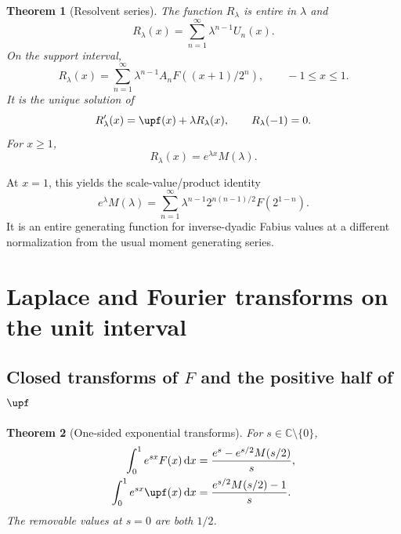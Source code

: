 \documentclass[11pt,oneside]{article}
\newtheorem{theorem}{Theorem}[section]
\theoremstyle{definition}
\theoremstyle{remark}
\newcommand{\C}{\mathbb C}
\newcommand{\dd}{\,\mathrm d}
\newcommand{\1}{\mathbf 1}
\begin{document}
\begin{theorem}[Resolvent series]
\label{p6:thm:resolvent}
The function \(R_\lambda\) is entire in \(\lambda\) and
\begin{equation}
 R_\lambda(x)=\sum_{n=1}^{\infty}\lambda^{n-1}U_n(x).     \label{p6:eq:resolvent-series}
\end{equation}
On the support interval,
\begin{equation}
 R_\lambda(x)=\sum_{n=1}^{\infty}\lambda^{n-1}
 A_nF((x+1)/2^n),\qquad -1\le x\le1.                     \label{p6:eq:resolvent-F-series}
\end{equation}
It is the unique solution of
\begin{equation}
 R_\lambda'(x)=\upf(x)+\lambda R_\lambda(x),\qquad R_\lambda(-1)=0. \label{p6:eq:resolvent-ode}
\end{equation}
For \(x\ge1\),
\begin{equation}
 R_\lambda(x)=e^{\lambda x}M(\lambda).                   \label{p6:eq:resolvent-tail}
\end{equation}
\end{theorem}

At \(x=1\), this yields the scale-value/product identity
\begin{equation}
 e^\lambda M(\lambda)
 =\sum_{n=1}^{\infty}\lambda^{n-1}
   2^{n(n-1)/2}F(2^{1-n}).                                \label{p6:eq:resolvent-product-identity}
\end{equation}
It is an entire generating function for inverse-dyadic Fabius values at a different
normalization from the usual moment generating series.

\section{Laplace and Fourier transforms on the unit interval}

\subsection{Closed transforms of \(F\) and the positive half of \(\upf\)}

\begin{theorem}[One-sided exponential transforms]
\label{p6:thm:one-sided-laplace}
For \(s\in\C\setminus\{0\}\),
\begin{align}
 \int_0^1e^{sx}F(x)\dd x
 &=\frac{e^s-e^{s/2}M(s/2)}{s},                           \label{p6:eq:F-laplace}\\
 \int_0^1e^{sx}\upf(x)\dd x
 &=\frac{e^{s/2}M(s/2)-1}{s}.                             \label{p6:eq:up-half-laplace}
\end{align}
The removable values at \(s=0\) are both \(1/2\).
\end{theorem}
\end{document}
